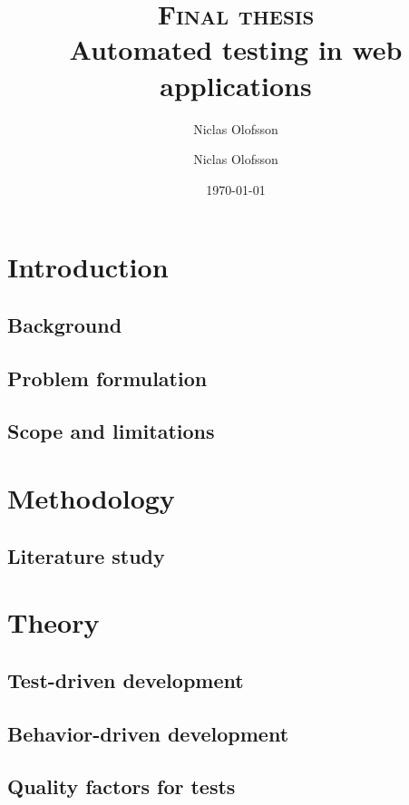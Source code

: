 \documentclass[a4paper]{report}
\author{Niclas Olofsson}
\title{\textsc{Final thesis}\\\Huge\textbf{Automated testing in web applications}}
\author{Niclas Olofsson}
\date{\today}
\begin{document}
\maketitle
\newpage

\begin{abstract}

\end{abstract}

\renewcommand{\abstractname}{Acknowledgments}
\begin{abstract}

\end{abstract}

\tableofcontents
\thispagestyle{empty} %
\newpage

\setcounter{page}{1}

\chapter{Introduction}

  \section{Background}
  

  \section{Problem formulation}
  

  \section{Scope and limitations}
  


\chapter{Methodology}
  

  \section{Literature study}
  



\chapter{Theory}

  \section{Test-driven development}
  

  \section{Behavior-driven development}
  

  \section{Quality factors for tests}
  




\end{document}
